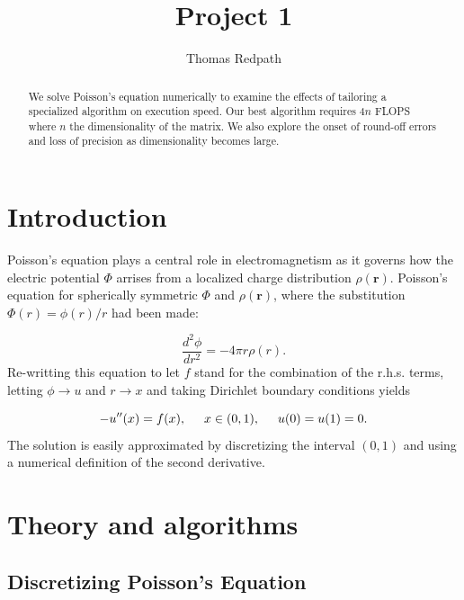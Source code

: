 \documentclass[10pt,showpacs,preprintnumbers,footinbib,amsmath,amssymb,aps,prl,twocolumn,groupedaddress,superscriptaddress,showkeys]{revtex4-1}
\newcommand{\deriv}[3][]{%
	\ensuremath{ \frac{d^{#1} {#2}}{d {#3}^{#1}} } }
\begin{document}
\title{Project 1}
\author{Thomas Redpath}
\begin{abstract}

We solve Poisson's equation numerically to examine the effects of tailoring a specialized algorithm on execution speed.
Our best algorithm requires $4n$ FLOPS where $n$ the dimensionality of the matrix. We also explore the onset of
round-off errors and loss of precision as dimensionality becomes large.

\end{abstract}
\maketitle

\section{Introduction}

Poisson's equation plays a central role in electromagnetism as it governs how the electric potential $\Phi$ arrises from a
localized charge distribution $\rho (\mathbf{r})$. Poisson's equation for spherically symmetric $\Phi$ and $\rho (\mathbf{r})$,
where the substitution $\Phi(r) = \phi(r)/r$ had been made:

\begin{equation*}
	\deriv[2]{\phi}{r}= -4\pi r\rho(r).
\end{equation*}
Re-writting this equation to let $f$ stand for the combination of the r.h.s. terms, letting $\phi \rightarrow u$ and
$r \rightarrow x$ and taking Dirichlet boundary conditions yields

\begin{equation*}
	-u''(x) = f(x), \hspace{0.5cm} x\in(0,1), \hspace{0.5cm} u(0) = u(1) = 0.
\end{equation*}
The solution is easily approximated by discretizing the interval $(0,1)$ and using a numerical definition of the second
derivative.

\section{Theory and algorithms}

\subsection{Discretizing Poisson's Equation}
\end{document}
